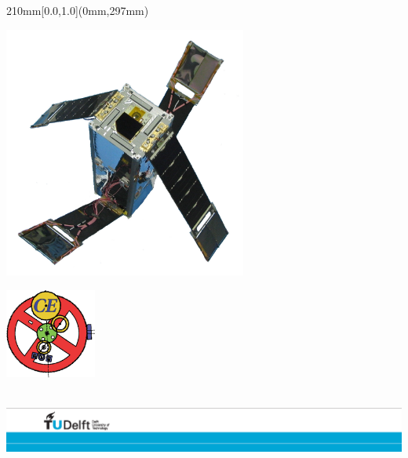 \begin {textblock*}{210mm}[0.0,1.0](0mm,297mm)
\noindent
\hspace{1.89cm}
\begin{center}
\includegraphics[width=8cm]{pics/Delfi-C3}
\end{center}
\hfill\parbox{5cm}{
\includegraphics[width=3cm]{pics/CE_conv}}
\hspace*{2cm}\\



\vspace*{1.5cm}
\noindent
\includegraphics[width=\textwidth]{pics/TU_border_A4_L_front}
\end{textblock*}

\null\newpage
